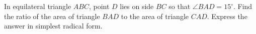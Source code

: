 In equilateral triangle $ABC$, point $D$ lies on side $BC$ so that $\angle BAD=15^\circ$. Find the ratio of the area of triangle $BAD$ to the area of triangle $CAD$. Express the answer in simplest radical form.
